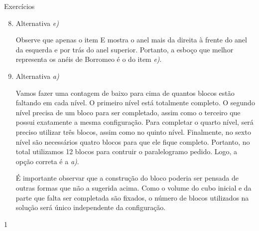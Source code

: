 \begin{answer}{Exercícios}
{\exerciselist
\begin{enumerate}\setcounter{enumi}{7}
\item Alternativa \textit{e)}

Observe que apenas o item E mostra o anel mais da direita à frente do anel da esquerda e por trás do anel superior. Portanto, a esboço que melhor representa os anéis de Borromeo é o do item \textit{e)}.

\item Alternativa \textit{a)}

Vamos fazer uma contagem de baixo para cima de quantos blocos estão faltando em cada nível. O primeiro nível está totalmente completo. O segundo nível precisa de um bloco para ser completado, assim como o terceiro que possui exatamente a mesma configuração. Para completar o quarto nível, será preciso utilizar três blocos, assim como no quinto nível. Finalmente, no sexto nível são necessários quatro blocos para que ele fique completo. Portanto, no total utilizamos 12 blocos para contruir o paralelogramo pedido. Logo, a opção correta é a \textit{a)}.

É importante observar que a construção do bloco poderia ser pensada de outras formas que não a sugerida acima. Como o volume do cubo inicial e da parte que falta ser completada são fixados, o número de blocos utilizados na solução será único independente da configuração.
\end{enumerate}
}{1}
\end{answer}
\clearmargin

